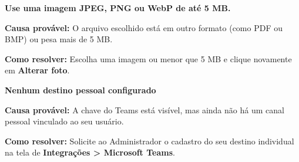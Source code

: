 \begin{remark}
\textbf{Use uma imagem JPEG, PNG ou WebP de até 5 MB.}\par
\textbf{Causa provável:} O arquivo escolhido está em outro formato (como PDF ou BMP) ou pesa mais de 5 MB.\par
\textbf{Como resolver:} Escolha uma imagem  ou  menor que 5 MB e clique novamente em \textbf{Alterar foto}.
\end{remark}

\begin{remark}
\textbf{Nenhum destino pessoal configurado}\par
\textbf{Causa provável:} A chave do Teams está visível, mas ainda não há um canal pessoal vinculado ao seu usuário.\par
\textbf{Como resolver:} Solicite ao Administrador o cadastro do seu destino individual na tela de \textbf{Integrações > Microsoft Teams}.
\end{remark}

\fimdecapitulo
